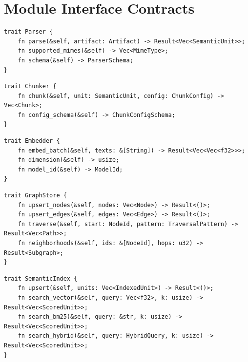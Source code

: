 \section{Module Interface Contracts}
\label{sec:architecture:contracts}

\begin{interface}[Parser]
\label{iface:parser}
\begin{verbatim}
trait Parser {
    fn parse(&self, artifact: Artifact) -> Result<Vec<SemanticUnit>>;
    fn supported_mimes(&self) -> Vec<MimeType>;
    fn schema(&self) -> ParserSchema;
}
\end{verbatim}
\end{interface}

\begin{interface}[Chunker]
\label{iface:chunker}
\begin{verbatim}
trait Chunker {
    fn chunk(&self, unit: SemanticUnit, config: ChunkConfig) -> Vec<Chunk>;
    fn config_schema(&self) -> ChunkConfigSchema;
}
\end{verbatim}
\end{interface}

\begin{interface}[Embedder]
\label{iface:embedder}
\begin{verbatim}
trait Embedder {
    fn embed_batch(&self, texts: &[String]) -> Result<Vec<Vec<f32>>>;
    fn dimension(&self) -> usize;
    fn model_id(&self) -> ModelId;
}
\end{verbatim}
\end{interface}

\begin{interface}[GraphStore]
\label{iface:graphstore}
\begin{verbatim}
trait GraphStore {
    fn upsert_nodes(&self, nodes: Vec<Node>) -> Result<()>;
    fn upsert_edges(&self, edges: Vec<Edge>) -> Result<()>;
    fn traverse(&self, start: NodeId, pattern: TraversalPattern) -> Result<Vec<Path>>;
    fn neighborhoods(&self, ids: &[NodeId], hops: u32) -> Result<Subgraph>;
}
\end{verbatim}
\end{interface}

\begin{interface}[SemanticIndex]
\label{iface:semantic-index}
\begin{verbatim}
trait SemanticIndex {
    fn upsert(&self, units: Vec<IndexedUnit>) -> Result<()>;
    fn search_vector(&self, query: Vec<f32>, k: usize) -> Result<Vec<ScoredUnit>>;
    fn search_bm25(&self, query: &str, k: usize) -> Result<Vec<ScoredUnit>>;
    fn search_hybrid(&self, query: HybridQuery, k: usize) -> Result<Vec<ScoredUnit>>;
}
\end{verbatim}
\end{interface}


